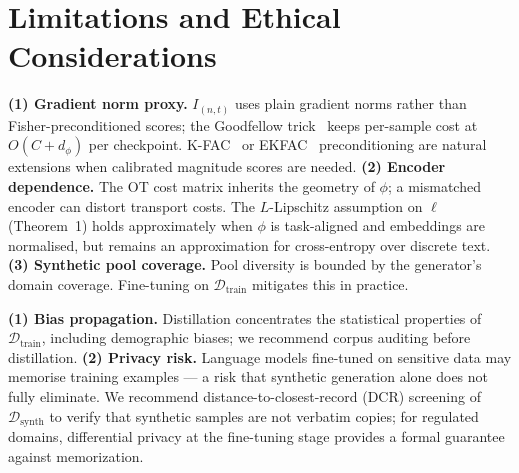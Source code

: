 \section{Limitations and Ethical Considerations} \label{sec:56-research03-limitations}

\begin{foldable} %
    \textbf{(1) Gradient norm proxy.}
    $I_{(n,t)}$ uses plain gradient norms rather than Fisher-preconditioned scores; the Goodfellow trick~\cite{goodfellow2015efficient} keeps per-sample cost at $O(C + d_\phi)$ per checkpoint.
    K-FAC~\cite{martens2015optimizing} or EKFAC~\cite{george2018fast} preconditioning are natural extensions when calibrated magnitude scores are needed.
    \textbf{(2) Encoder dependence.}
    The OT cost matrix inherits the geometry of $\phi$; a mismatched encoder can distort transport costs.
    The $L$-Lipschitz assumption on $\ell$ (Theorem~1) holds approximately when $\phi$ is task-aligned and embeddings are normalised, but remains an approximation for cross-entropy over discrete text.
    \textbf{(3) Synthetic pool coverage.}
    Pool diversity is bounded by the generator's domain coverage.
    Fine-tuning on $\mathcal{D}_\text{train}$ mitigates this in practice.
\end{foldable}

\begin{foldable} %
    \textbf{(1) Bias propagation.}
    Distillation concentrates the statistical properties of $\mathcal{D}_\text{train}$, including demographic biases; we recommend corpus auditing before distillation.
    \textbf{(2) Privacy risk.}
    Language models fine-tuned on sensitive data may memorise training examples --- a risk that synthetic generation alone does not fully eliminate.
    We recommend distance-to-closest-record (DCR) screening of $\mathcal{D}_\text{synth}$ to verify that synthetic samples are not verbatim copies; for regulated domains, differential privacy at the fine-tuning stage provides a formal guarantee against memorization.
\end{foldable}
